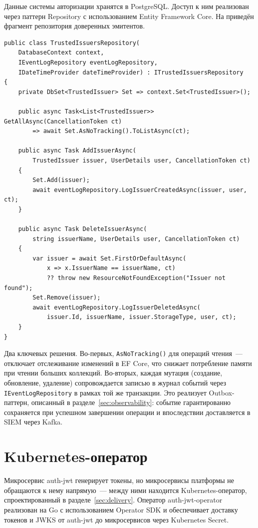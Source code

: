 Данные системы авторизации хранятся в PostgreSQL.
Доступ к ним реализован через паттерн Repository
с использованием Entity Framework Core.
На  приведён
фрагмент репозитория доверенных эмитентов.

\begin{lstlisting}[language={[Sharp]C}]
public class TrustedIssuersRepository(
    DatabaseContext context,
    IEventLogRepository eventLogRepository,
    IDateTimeProvider dateTimeProvider) : ITrustedIssuersRepository
{
    private DbSet<TrustedIssuer> Set => context.Set<TrustedIssuer>();

    public async Task<List<TrustedIssuer>> GetAllAsync(CancellationToken ct)
        => await Set.AsNoTracking().ToListAsync(ct);

    public async Task AddIssuerAsync(
        TrustedIssuer issuer, UserDetails user, CancellationToken ct)
    {
        Set.Add(issuer);
        await eventLogRepository.LogIssuerCreatedAsync(issuer, user, ct);
    }

    public async Task DeleteIssuerAsync(
        string issuerName, UserDetails user, CancellationToken ct)
    {
        var issuer = await Set.FirstOrDefaultAsync(
            x => x.IssuerName == issuerName, ct)
            ?? throw new ResourceNotFoundException("Issuer not found");
        Set.Remove(issuer);
        await eventLogRepository.LogIssuerDeletedAsync(
            issuer.Id, issuerName, issuer.StorageType, user, ct);
    }
}
\end{lstlisting}

Два ключевых решения.
Во-первых, \texttt{AsNoTracking()} для операций чтения~---
отключает отслеживание изменений в EF Core,
что снижает потребление памяти при чтении больших коллекций.
Во-вторых, каждая мутация (создание, обновление, удаление)
сопровождается записью в журнал событий
через \texttt{IEventLogRepository} в рамках той же транзакции.
Это реализует Outbox-паттерн, описанный в разделе~\ref{sec:observability}:
событие гарантированно сохраняется при успешном завершении операции
и впоследствии доставляется в SIEM через Kafka.

\section{Kubernetes-оператор}\label{sec:operator-impl}

Микросервис auth-jwt генерирует токены,
но микросервисы платформы не обращаются к нему напрямую~---
между ними находится Kubernetes-оператор,
спроектированный в разделе~\ref{sec:delivery}.
Оператор auth-jwt-operator реализован на Go
с использованием Operator SDK
и обеспечивает доставку токенов и JWKS
от auth-jwt до микросервисов через Kubernetes Secret.

